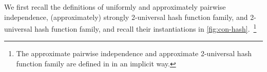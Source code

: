 %
 We first recall the definitions of uniformly and approximately pairwise independence, (approximately) strongly 2-universal hash function family, and 2-universal hash function family, and recall their instantiations in \cref{fig:con-hash}.~\footnote{The approximate pairwise independence and approximate 2-universal hash function family are defined in \cite{FOCS:Zuckerman91,C:CacMau97} in an implicit way.}

%
%
%
%
%
%
